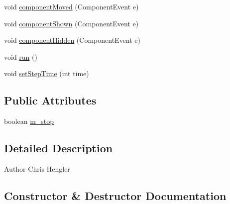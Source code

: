 \begin{DoxyCompactItemize}
\item 
void \hyperlink{classio_1_1github_1_1chrishengler_1_1conway_1_1_conway_canvas_a8e96f073d34272ea0fba93f41602411e}{component\+Moved} (Component\+Event e)
\item 
void \hyperlink{classio_1_1github_1_1chrishengler_1_1conway_1_1_conway_canvas_a6c512471e9814651ad1fd6ecb777e713}{component\+Shown} (Component\+Event e)
\item 
void \hyperlink{classio_1_1github_1_1chrishengler_1_1conway_1_1_conway_canvas_ad29ca955072daf022bca4303c1bb0a98}{component\+Hidden} (Component\+Event e)
\item 
void \hyperlink{classio_1_1github_1_1chrishengler_1_1conway_1_1_conway_canvas_a70f6dce6432c31a3532ef586df1d9420}{run} ()
\item 
void \hyperlink{classio_1_1github_1_1chrishengler_1_1conway_1_1_conway_canvas_a2f203de7f6ceca7ca93413bf7a4e9093}{set\+Step\+Time} (int time)
\end{DoxyCompactItemize}
\subsection*{Public Attributes}
\begin{DoxyCompactItemize}
\item 
boolean \hyperlink{classio_1_1github_1_1chrishengler_1_1conway_1_1_conway_canvas_acf462c13551f9c841d16cc960830ee7e}{m\+\_\+stop}
\end{DoxyCompactItemize}


\subsection{Detailed Description}
\begin{DoxyAuthor}{Author}
Chris Hengler 
\end{DoxyAuthor}


\subsection{Constructor \& Destructor Documentation}
